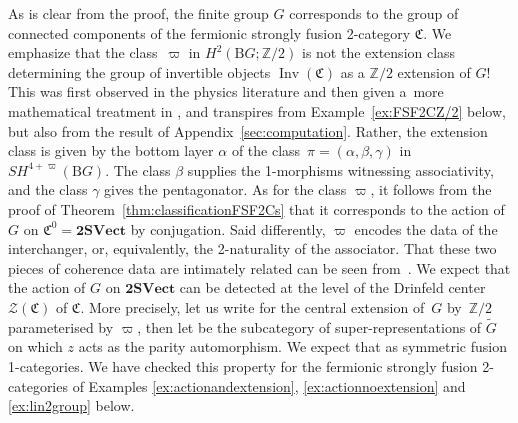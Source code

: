 \documentclass[pdftex]{sigma}
\numberwithin{equation}{section}
\begin{document}
\begin{Remark}\label{rem:varpialphaunfolding}
As is clear from the proof, the finite group $G$ corresponds to the group of connected components of the fermionic strongly fusion 2-category $\mathfrak{C}$. We emphasize that the class~$\varpi$ in $H^2(\mathrm{B}G;\mathbb{Z}/2)$ is not the extension class determining the group of invertible objects $\operatorname{Inv}(\mathfrak{C})$ as a $\mathbb{Z}/2$ extension of $G$! This was first observed in the physics literature \cite{LW} and then given a~more mathematical treatment in \cite{JF2}, and transpires from Example~\ref{ex:FSF2CZ/2} below, but also from the result of Appendix~\ref{sec:computation}. Rather, the extension class is given by the bottom layer $\alpha$ of the class~${\pi=(\alpha,\beta,\gamma)}$ in $SH^{4+\varpi}(\mathrm{B}G)$. The class $\beta$ supplies the 1-morphisms witnessing associativity, and the class $\gamma$ gives the pentagonator. As for the class $\varpi$, it follows from the proof of Theorem~\ref{thm:classificationFSF2Cs} that it corresponds to the action of $G$ on $\mathfrak{C}^0=\mathbf{2SVect}$ by conjugation. Said differently, $\varpi$ encodes the data of the interchanger, or, equivalently, the 2-naturality of the associator. That these two pieces of coherence data are intimately related can be seen from~\cite[Proposition~4.2, equation~(A$\hat{a}$2)]{El1}. We expect that the action of $G$ on $\mathbf{2SVect}$ can be detected at the level of the Drinfeld center $\mathscr{Z}(\mathfrak{C})$ of $\mathfrak{C}$. More precisely, let us write  for the central extension of~$G$ by~$\mathbb{Z}/2$ parameterised by $\varpi$, then let  be the subcategory of super-representations of $\widetilde{G}$ on which $z$ acts as the parity automorphism. We expect that  as symmetric fusion 1-categories. We have checked this property for the fermionic strongly fusion 2-categories of Examples \ref{ex:actionandextension}, \ref{ex:actionnoextension} and \ref{ex:lin2group} below.
\end{Remark}
\end{document}
